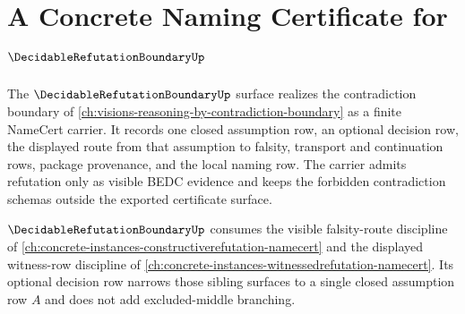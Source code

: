 \chapter{A Concrete Naming Certificate for $\DecidableRefutationBoundaryUp$}
\label{ch:concrete-instances-decidable-refutation-boundary-namecert}

The $\DecidableRefutationBoundaryUp$ surface realizes the contradiction boundary of \autoref{ch:visions-reasoning-by-contradiction-boundary} as a finite NameCert carrier. It records one closed assumption row, an optional decision row, the displayed route from that assumption to falsity, transport and continuation rows, package provenance, and the local naming row. The carrier admits refutation only as visible BEDC evidence and keeps the forbidden contradiction schemas outside the exported certificate surface.

$\DecidableRefutationBoundaryUp$ consumes the visible falsity-route discipline of \autoref{ch:concrete-instances-constructiverefutation-namecert} and the displayed witness-row discipline of \autoref{ch:concrete-instances-witnessedrefutation-namecert}. Its optional decision row narrows those sibling surfaces to a single closed assumption row $A$ and does not add excluded-middle branching.

